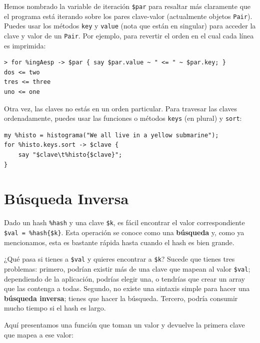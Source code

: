 Hemos nombrado la variable de iteración \verb|$par| para
resaltar más claramente que el programa está iterando
sobre los pares clave-valor (actualmente objetos \verb|Pair|).
Puedes usar los métodos {\tt key} y {\tt value} (nota que
están en singular) para acceder
la clave y valor de un \verb|Pair|. Por ejemplo, para revertir
el orden en el cual cada línea es imprimida:

\begin{verbatim}
> for %ingAesp -> $par { say $par.value ~ " <= " ~ $par.key; }
dos <= two
tres <= three
uno <= one
\end{verbatim}

Otra vez, las claves no estás en un orden particular. Para
travesar las claves ordenadamente, puedes usar las funciones
o métodos {\tt keys} (en plural) y {\tt sort}:

\begin{verbatim}
my %histo = histograma("We all live in a yellow submarine");
for %histo.keys.sort -> $clave {
    say "$clave\t%histo{$clave}";
}
\end{verbatim}



\section{Búsqueda Inversa}
\label{raise}

Dado un hash \verb|%hash| y una clave \verb|$k|, es fácil 
encontrar el valor correspondiente \verb|$val = %hash{$k}|.
Esta operación se conoce como una {\bf búsqueda} y, como ya
mencionamos, esta es bastante rápida hasta cuando el hash
es bien grande.

¿Qué pasa si tienes a \verb|$val| y quieres encontrar a \verb|$k|?
Sucede que tienes tres problemas: primero, podrían existir más
de una clave que mapean al valor \verb|$val|; dependiendo de
la aplicación, podrías elegir una, o tendrías que crear un array 
que las contenga a todas. Segundo, no existe una sintaxis simple
para hacer una {\bf búsqueda inversa}; tienes que hacer la búsqueda.
Tercero, podría consumir mucho tiempo si el hash es largo.

Aquí presentamos una función que toman un valor y devuelve
la primera clave que mapea a ese valor:

